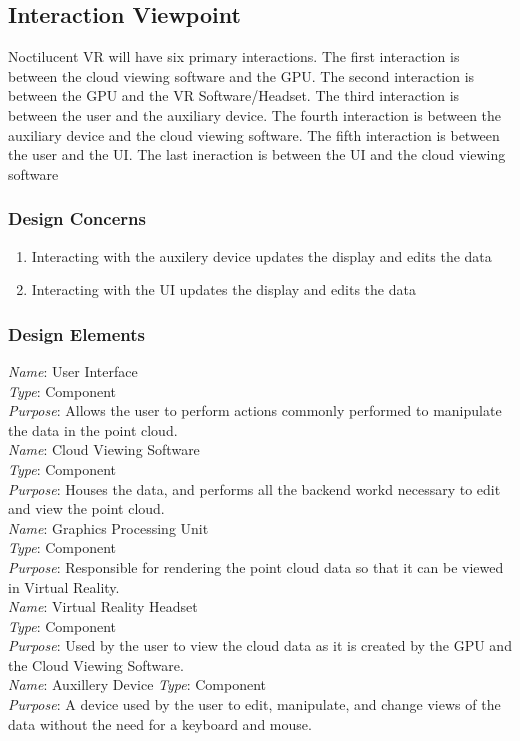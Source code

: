 \documentclass{article}
\begin{document}
\subsection{Interaction Viewpoint}

Noctilucent VR will have six primary interactions.
The first interaction is between the cloud viewing software and the GPU.
The second interaction is between the GPU and the VR Software/Headset.
The third interaction is between the user and the auxiliary device.
The fourth interaction is between the auxiliary device and the cloud viewing software.
The fifth interaction is between the user and the UI.
The last ineraction is between the UI and the cloud viewing software

\subsubsection{Design Concerns}

\begin{enumerate}
	\item Interacting with the auxilery device updates the display and edits the data
	\item Interacting with the UI updates the display and edits the data
\end{enumerate}

\subsubsection{Design Elements}

		\textit{Name}: User Interface\\
		\textit{Type}: Component\\
		\textit{Purpose}: Allows the user to perform actions commonly performed to manipulate the data in the point cloud.\\
\newline
		\textit{Name}: Cloud Viewing Software\\
		\textit{Type}: Component\\
		\textit{Purpose}: Houses the data, and performs all the backend workd necessary to edit and view the point cloud.\\
\newline
		\textit{Name}: Graphics Processing Unit\\
		\textit{Type}: Component\\
		\textit{Purpose}: Responsible for rendering the point cloud data so that it can be viewed in Virtual Reality.\\
\newline
		\textit{Name}: Virtual Reality Headset\\
		\textit{Type}: Component\\
		\textit{Purpose}: Used by the user to view the cloud data as it is created by the GPU and the Cloud Viewing Software.\\
\newline
		\textit{Name}: Auxillery Device
		\textit{Type}: Component\\
		\textit{Purpose}: A device used by the user to edit, manipulate, and change views of the data without the need for a keyboard and mouse.
\end{document}
